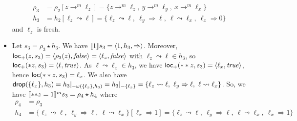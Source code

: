 \begin{example}
\begin{itemize}
    \begin{align*}
      \rho_3 & = \rho_2[z\to^m\ell_z] = \{z\to^m\ell_z,\ y\to^m\ell_y,\ x\to^m\ell_x\}\\
      h_3 & = h_2[\ell_z\leadsto \ell] =
      \{\ell_z\leadsto \ell,\
      \ell_y\Rightarrow \ell,\ \ell\leadsto\ell_x,\ \ell_x\Rightarrow 0\}
    \end{align*}
    and $\ell_z$ is fresh.
    \item Let $s_3 = \rho_3 \star h_3$.
    We have $\den[1]{s_3} = \langle 1,h_3,\Rightarrow\rangle$.
    Moreover, $\locread(z,s_3)=\langle\rho_3(z),\mathit{false}\rangle=
    \langle\ell_z,\mathit{false}\rangle$ with $\ell_z\leadsto \ell\in h_3$,
    so $\locread(*z,s_3)=\langle\ell,\mathit{true}\rangle$.
    As $\ell\leadsto\ell_x\in h_3$, we have
    $\locread(**z,s_3)=\langle\ell_x,\mathit{true}\rangle$, hence
    $\loc(**z,s_3)=\ell_x$. We also have
    $\drop(\{\ell_x\},h_3) = h_3|_{-{\omega(\{\ell_x\},h_3)}} = h_3|_{-{\{\ell_x\}}}
    = \{\ell_z\leadsto \ell,\ \ell_y\Rightarrow \ell,\ \ell\leadsto\ell_x\}$.
    So, we have $\denl[\mathtt{**}z = 1]{m}{s_3} = \rho_4 \star h_4$ where
    \begin{align*}
      \rho_4 & = \rho_3\\
      h_4 & = \{\ell_z\leadsto \ell,\ \ell_y\Rightarrow \ell,\
      \ell\leadsto\ell_x\}[\ell_x\Rightarrow 1] =
      \{\ell_z\leadsto \ell,\ \ell_y\Rightarrow \ell,\ \ell\leadsto\ell_x,\
      \ell_x\Rightarrow 1\}
    \end{align*}
  \end{itemize}
\end{example}

